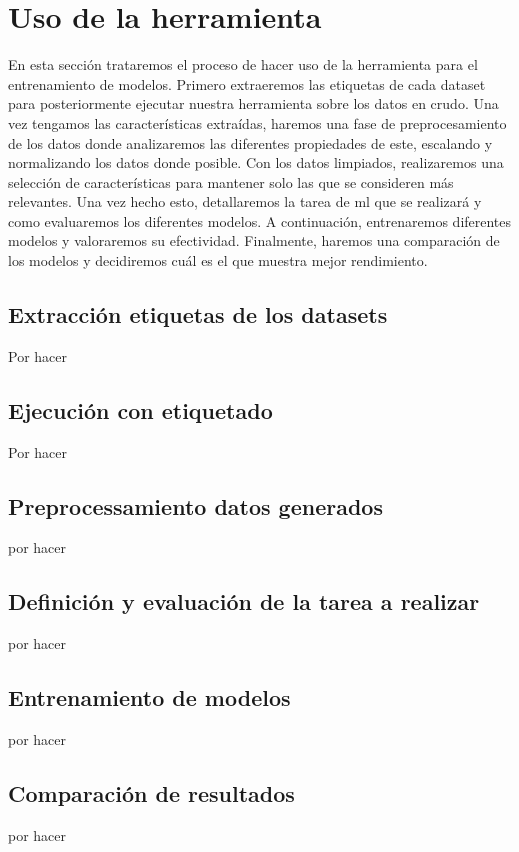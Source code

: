 \section{Uso de la herramienta}

En esta sección trataremos el proceso de hacer uso de la herramienta para el entrenamiento de modelos. Primero extraeremos las etiquetas de cada dataset para posteriormente ejecutar nuestra herramienta sobre los datos en crudo. Una vez tengamos las características extraídas, haremos una fase de preprocesamiento de los datos donde analizaremos las diferentes propiedades de este, escalando y normalizando los datos donde posible. Con los datos limpiados, realizaremos una selección de características para mantener solo las que se consideren más relevantes. Una vez hecho esto, detallaremos la tarea de \gls{ml} que se realizará y como evaluaremos los diferentes modelos. A continuación, entrenaremos diferentes modelos y valoraremos su efectividad. Finalmente, haremos una comparación de los modelos y decidiremos cuál es el que muestra mejor rendimiento.

\subsection{Extracción etiquetas de los datasets}

Por hacer

\subsection{Ejecución con etiquetado}

Por hacer

\subsection{Preprocessamiento datos generados}

por hacer

\subsection{Definición y evaluación de la tarea a realizar}

por hacer

\subsection{Entrenamiento de modelos}

por hacer

\subsection{Comparación de resultados}

por hacer

